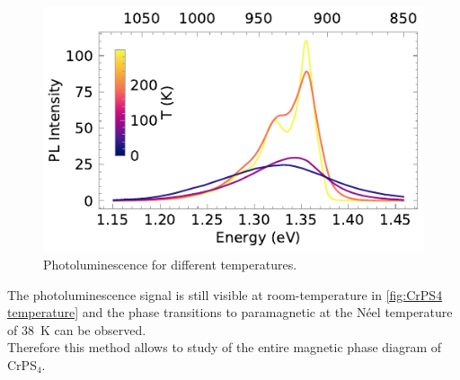 \documentclass[
	oneside,
	parskip=half,
	a4paper,
]{scrbook}
\begin{document}
\begin{figure}
	\centering
	\includegraphics{../figures/2024-04-22 CrPS4 temperature series.pdf}
	\caption{Photoluminescence for different temperatures.}
	\label{fig:CrPS4 temperature}
\end{figure}
The photoluminescence signal is still visible at room-temperature in \autoref{fig:CrPS4 temperature} and the phase transitions to paramagnetic at the Néel temperature of \SI{38}{K} \cite{CrPS4_magnetic} can be observed.\\
Therefore this method allows to study of the entire magnetic phase diagram of CrPS$_4$.


\clearpage
\end{document}
